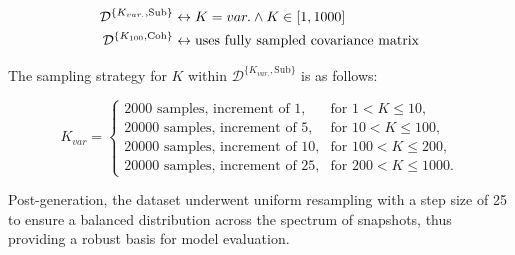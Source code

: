 \begin{align*}
    \mathcal{D}^{\{K_{var.},\text{Sub}\}} &\leftrightarrow  K = var. \land K \in [1, 1000]\\
    \mathcal{D}^{\{K_{100},\text{Coh}\}} &\leftrightarrow  \text{uses fully sampled covariance matrix}\\
\end{align*}


The sampling strategy for \( K \) within \( \mathcal{D}^{\{K_{var.},\text{Sub}\}} \) is as follows:

\[
    K_{var} =
\begin{cases}
    \text{2000 samples, increment of 1,} & \text{for } 1 < K \leq 10, \\
    \text{20000 samples, increment of 5,} & \text{for } 10 < K \leq 100, \\
    \text{20000 samples, increment of 10,} & \text{for } 100 < K \leq 200, \\
    \text{20000 samples, increment of 25,} & \text{for } 200 < K \leq 1000.
\end{cases}
\]

Post-generation, the dataset underwent uniform resampling with a step size of 25 to ensure a balanced distribution across
the spectrum of snapshots, thus providing a robust basis for model evaluation.


